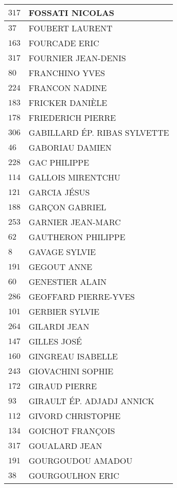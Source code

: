\begin{xltabular}{\linewidth}{|l|X|}
    \hline
    $317$ & FOSSATI NICOLAS \\
    \hline
    $37$ & FOUBERT LAURENT \\
    \hline
    $163$ & FOURCADE ERIC \\
    \hline
    $317$ & FOURNIER JEAN-DENIS \\
    \hline
    $80$ & FRANCHINO YVES \\
    \hline
    $224$ & FRANCON NADINE \\
    \hline
    $183$ & FRICKER DANIÈLE \\
    \hline
    $178$ & FRIEDERICH PIERRE \\
    \hline
    $306$ & GABILLARD ÉP. RIBAS SYLVETTE \\
    \hline
    $46$ & GABORIAU DAMIEN \\
    \hline
    $228$ & GAC PHILIPPE \\
    \hline
    $114$ & GALLOIS MIRENTCHU \\
    \hline
    $121$ & GARCIA JÉSUS \\
    \hline
    $188$ & GARÇON GABRIEL \\
    \hline
    $253$ & GARNIER JEAN-MARC \\
    \hline
    $62$ & GAUTHERON PHILIPPE \\
    \hline
    $8$ & GAVAGE SYLVIE \\
    \hline
    $191$ & GEGOUT ANNE \\
    \hline
    $60$ & GENESTIER ALAIN \\
    \hline
    $286$ & GEOFFARD PIERRE-YVES \\
    \hline
    $101$ & GERBIER SYLVIE \\
    \hline
    $264$ & GILARDI JEAN \\
    \hline
    $147$ & GILLES JOSÉ \\
    \hline
    $160$ & GINGREAU ISABELLE \\
    \hline
    $243$ & GIOVACHINI SOPHIE \\
    \hline
    $172$ & GIRAUD PIERRE \\
    \hline
    $93$ & GIRAULT ÉP. ADJADJ ANNICK \\
    \hline
    $112$ & GIVORD CHRISTOPHE \\
    \hline
    $134$ & GOICHOT FRANÇOIS \\
    \hline
    $317$ & GOUALARD JEAN \\
    \hline
    $191$ & GOURGOUDOU AMADOU \\
    \hline
    $38$ & GOURGOULHON ERIC \\

\end{xltabular}
